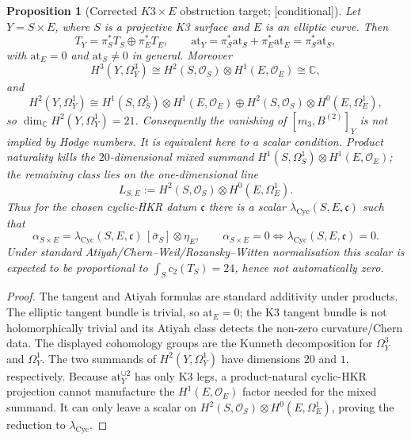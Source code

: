 \documentclass[11pt,reqno]{amsart}
\theoremstyle{plain}
\newtheorem{proposition}[theorem]{Proposition}
\theoremstyle{definition}
\theoremstyle{remark}
\providecommand{\ClaimStatusConditional}{\textnormal{[conditional]}}
\newcommand{\Cbb}{\mathbb{C}}
\newcommand{\cO}{\mathcal{O}}
\newcommand{\at}{\mathrm{at}}
\begin{document}
\begin{proposition}[Corrected $K3\times E$ obstruction target; \ClaimStatusConditional]
\label{prop:k3e-vanish}
Let $Y=S\times E$, where $S$ is a projective K3 surface and $E$ is an
elliptic curve. Then
\[
  T_Y=\pi_S^*T_S\oplus\pi_E^*T_E,\qquad
  \at_Y=\pi_S^*\at_S+\pi_E^*\at_E=\pi_S^*\at_S,
\]
with $\at_E=0$ and $\at_S\neq0$ in general. Moreover
\[
H^3(Y,\Omega_Y^3)\cong
H^2(S,\cO_S)\otimes H^1(E,\cO_E)\cong \Cbb,
\]
and
\[
H^2(Y,\Omega_Y^1)\cong
H^1(S,\Omega_S^1)\otimes H^1(E,\cO_E)
\oplus
H^2(S,\cO_S)\otimes H^0(E,\Omega_E^1),
\]
so $\dim_\Cbb H^2(Y,\Omega_Y^1)=21$. Consequently the vanishing of
$[m_3,B^{(2)}]_Y$ is not implied by Hodge numbers. It is equivalent
here to a scalar condition. Product naturality kills the
$20$-dimensional mixed summand
$H^1(S,\Omega_S^1)\otimes H^1(E,\cO_E)$; the remaining class lies on
the one-dimensional line
\[
  L_{S,E}:=H^2(S,\cO_S)\otimes H^0(E,\Omega_E^1).
\]
Thus for the chosen cyclic-HKR datum $\mathfrak c$ there is a scalar
$\lambda_{\mathrm{Cyc}}(S,E,\mathfrak c)$ such that
\[
  \alpha_{S\times E}
  =
  \lambda_{\mathrm{Cyc}}(S,E,\mathfrak c)\,
  [\bar\sigma_S]\otimes\eta_E,
  \qquad
  \alpha_{S\times E}=0
  \Longleftrightarrow
  \lambda_{\mathrm{Cyc}}(S,E,\mathfrak c)=0.
\]
Under standard Atiyah/Chern--Weil/Rozansky--Witten normalisation this
scalar is expected to be proportional to $\int_S c_2(T_S)=24$, hence
not automatically zero.
\end{proposition}

\begin{proof}
The tangent and Atiyah formulas are standard additivity under products.
The elliptic tangent bundle is trivial, so $\at_E=0$; the K3 tangent
bundle is not holomorphically trivial and its Atiyah class detects the
non-zero curvature/Chern data. The displayed cohomology groups are the
Kunneth decomposition for $\Omega_Y^3$ and $\Omega_Y^1$. The two
summands of $H^2(Y,\Omega_Y^1)$ have dimensions $20$ and $1$,
respectively. Because $\at_Y^{\cup2}$ has only K3 legs, a
product-natural cyclic-HKR projection cannot manufacture the
$H^1(E,\cO_E)$ factor needed for the mixed summand. It can only leave a
scalar on $H^2(S,\cO_S)\otimes H^0(E,\Omega_E^1)$, proving the
reduction to $\lambda_{\mathrm{Cyc}}$.
\end{proof}
\end{document}
